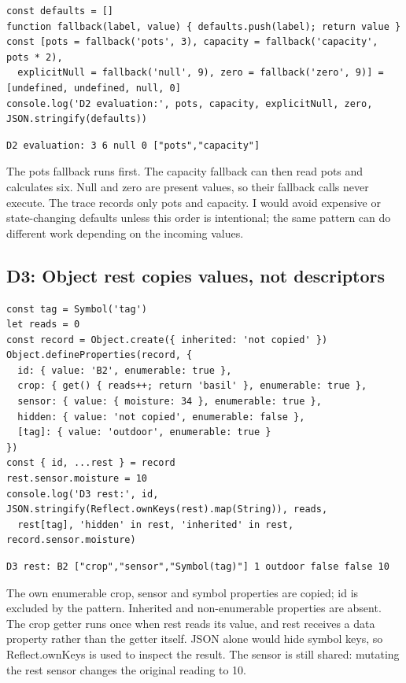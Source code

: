 \documentclass[
  10pt,
  a4paper,
]{article}
\begin{document}
\begin{lstlisting}
const defaults = []
function fallback(label, value) { defaults.push(label); return value }
const [pots = fallback('pots', 3), capacity = fallback('capacity', pots * 2),
  explicitNull = fallback('null', 9), zero = fallback('zero', 9)] = [undefined, undefined, null, 0]
console.log('D2 evaluation:', pots, capacity, explicitNull, zero, JSON.stringify(defaults))
\end{lstlisting}

\begin{lstlisting}
D2 evaluation: 3 6 null 0 ["pots","capacity"]
\end{lstlisting}

The pots fallback runs first. The capacity fallback can then read pots
and calculates six. Null and zero are present values, so their fallback
calls never execute. The trace records only pots and capacity. I would
avoid expensive or state-changing defaults unless this order is
intentional; the same pattern can do different work depending on the
incoming values.

\subsection{D3: Object rest copies values, not
descriptors}\label{d3-object-rest-copies-values-not-descriptors}

\begin{lstlisting}
const tag = Symbol('tag')
let reads = 0
const record = Object.create({ inherited: 'not copied' })
Object.defineProperties(record, {
  id: { value: 'B2', enumerable: true },
  crop: { get() { reads++; return 'basil' }, enumerable: true },
  sensor: { value: { moisture: 34 }, enumerable: true },
  hidden: { value: 'not copied', enumerable: false },
  [tag]: { value: 'outdoor', enumerable: true }
})
const { id, ...rest } = record
rest.sensor.moisture = 10
console.log('D3 rest:', id, JSON.stringify(Reflect.ownKeys(rest).map(String)), reads,
  rest[tag], 'hidden' in rest, 'inherited' in rest, record.sensor.moisture)
\end{lstlisting}

\begin{lstlisting}
D3 rest: B2 ["crop","sensor","Symbol(tag)"] 1 outdoor false false 10
\end{lstlisting}

The own enumerable crop, sensor and symbol properties are copied; id is
excluded by the pattern. Inherited and non-enumerable properties are
absent. The crop getter runs once when rest reads its value, and rest
receives a data property rather than the getter itself. JSON alone would
hide symbol keys, so Reflect.ownKeys is used to inspect the result. The
sensor is still shared: mutating the rest sensor changes the original
reading to 10.
\end{document}
